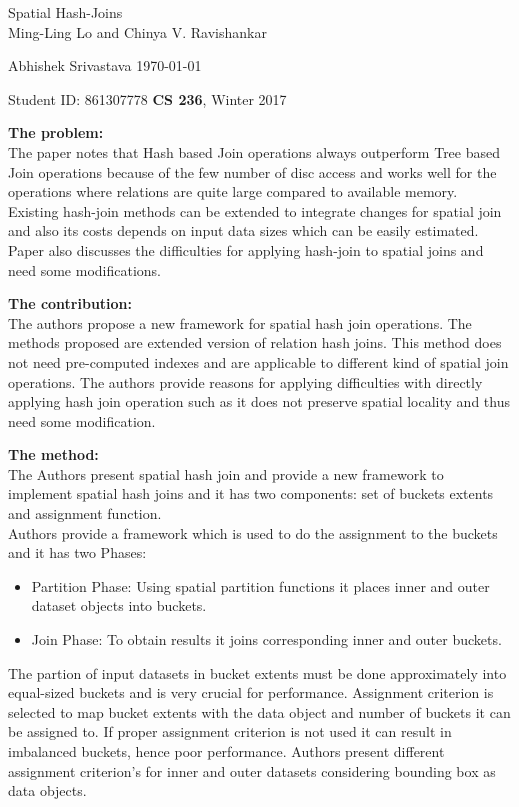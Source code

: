 \documentclass[a4paper,12pt, twoside]{article}
\renewcommand{\maketitle}{%
 	\Large
 	\begin{center}
 	Spatial Hash-Joins \\	
 	\normalsize Ming-Ling Lo and Chinya V. Ravishankar
 	\end{center}
 
 	\Large
	Abhishek Srivastava
	\hfill
	\normalsize
	\today
 	\par
 	Student ID: 861307778
 	\hfill
 	\textbf{CS 236}, Winter 2017
 	\par 	
 	\hrulefill
 	\par
 	}
\begin{document}
\thispagestyle{empty}
	
\maketitle

\textbf{The problem:}\\
The paper notes that Hash based Join operations always outperform Tree based Join operations because of the few number of disc access and works well for the operations where relations are quite large compared to available memory. Existing hash-join methods can be extended to integrate changes for spatial join and also its costs depends on input data sizes which can be easily estimated. Paper also discusses the difficulties for applying hash-join to spatial joins and need some modifications.

\textbf{The contribution:}\\
The authors propose a new framework for spatial hash join operations. The methods proposed are extended version of relation hash joins. This method does not need pre-computed indexes and are applicable to different kind of spatial join operations. The authors provide reasons for applying difficulties with directly applying hash join operation such as it does not preserve spatial locality and thus need some modification.

\textbf{The method:}\\
The Authors present spatial hash join and provide a new framework  to implement spatial hash joins and it has two components: set of buckets extents and assignment function.\\

Authors provide a framework which is used to do the assignment to the buckets and it has two Phases: 
\begin{itemize}
	\item Partition Phase:  Using spatial partition functions it places inner and outer dataset objects into buckets.
	\item Join Phase: To obtain results it joins corresponding inner and outer buckets.
\end{itemize}

The partion of input datasets in bucket extents must be done approximately into equal-sized buckets and is very crucial for performance. Assignment criterion is selected to map bucket extents with the data object and number of buckets it can be assigned to. If proper assignment criterion is not used it can result in imbalanced buckets, hence poor performance. Authors present different assignment criterion's for inner and outer datasets considering bounding box as data objects. 
\end{document}

